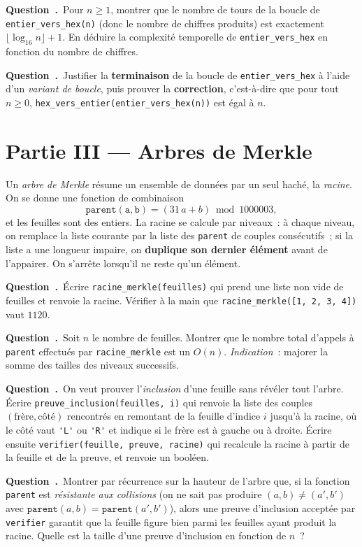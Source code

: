\documentclass[11pt,a4paper]{article}
\newcounter{qcnt}
\newcommand{\Q}{\medskip\par\stepcounter{qcnt}\noindent\textbf{Question~\theqcnt.}~}
\newcommand{\code}[1]{\lstinline!#1!}
\begin{document}
\Q Pour $n \ge 1$, montrer que le nombre de tours de la boucle de \code{entier_vers_hex(n)}
(donc le nombre de chiffres produits) est exactement $\lfloor \log_{16} n \rfloor + 1$. En déduire
la complexité temporelle de \code{entier_vers_hex} en fonction du nombre de chiffres.

\Q Justifier la \textbf{terminaison} de la boucle de \code{entier_vers_hex} à l'aide d'un
\emph{variant de boucle}, puis prouver la \textbf{correction}, c'est-à-dire que pour tout
$n \ge 0$, \code{hex_vers_entier(entier_vers_hex(n))} est égal à $n$.

\section*{Partie III --- Arbres de Merkle}

Un \emph{arbre de Merkle} résume un ensemble de données par un seul haché, la \emph{racine}. On
se donne une fonction de combinaison
$$\mathtt{parent(a, b)} = (31\,a + b) \bmod 1000003,$$
et les feuilles sont des entiers. La racine se calcule par niveaux~: à chaque niveau, on remplace
la liste courante par la liste des \code{parent} de couples consécutifs~; si la liste a une
longueur impaire, on \textbf{duplique son dernier élément} avant de l'appairer. On s'arrête
lorsqu'il ne reste qu'un élément.

\Q Écrire \code{racine_merkle(feuilles)} qui prend une liste non vide de feuilles et renvoie la
racine. Vérifier à la main que \code{racine_merkle([1, 2, 3, 4])} vaut $1120$.

\Q Soit $n$ le nombre de feuilles. Montrer que le nombre total d'appels à \code{parent} effectués
par \code{racine_merkle} est un $O(n)$. \emph{Indication}~: majorer la somme des tailles des
niveaux successifs.

\Q On veut prouver l'\emph{inclusion} d'une feuille sans révéler tout l'arbre. Écrire
\code{preuve_inclusion(feuilles, i)} qui renvoie la liste des couples $(\text{frère}, \text{côté})$
rencontrés en remontant de la feuille d'indice $i$ jusqu'à la racine, où le côté vaut
\code{'L'} ou \code{'R'} et indique si le frère est à gauche ou à droite. Écrire ensuite
\code{verifier(feuille, preuve, racine)} qui recalcule la racine à partir de la feuille et de la
preuve, et renvoie un booléen.

\Q Montrer par récurrence sur la hauteur de l'arbre que, si la fonction \code{parent} est
\emph{résistante aux collisions} (on ne sait pas produire $ (a,b) \ne (a',b')$ avec
$\mathtt{parent}(a,b) = \mathtt{parent}(a',b')$), alors une preuve d'inclusion acceptée par
\code{verifier} garantit que la feuille figure bien parmi les feuilles ayant produit la racine.
Quelle est la taille d'une preuve d'inclusion en fonction de $n$~?
\end{document}
